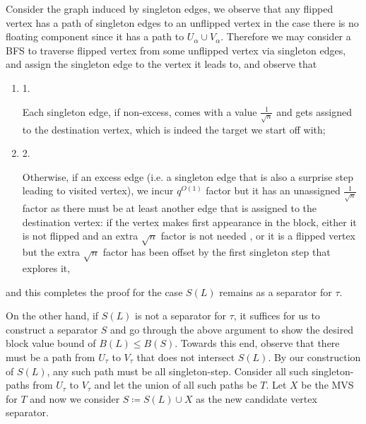 \documentclass[10pt,a4paper]{article}
\begin{document}
Consider the graph induced by singleton edges, we observe that any flipped vertex has a path of singleton edges to an unflipped vertex in the case there is no floating component since it has a path to $U_{\alpha}\cup V_{\alpha}$. Therefore we may consider a BFS to traverse flipped vertex from some unflipped vertex via singleton edges, and assign the singleton edge to the vertex it leads to, and observe that\par


\begin{enumerate}


\item[] 
1. 


Each singleton edge, if non-excess, comes with a value $\frac{1}{\sqrt{n}}$ and gets assigned to the destination vertex, which is indeed the target we start off with;\par





\item[] 
2. 


Otherwise, if an excess edge (i.e. a singleton edge that is also a surprise step leading to visited vertex), we incur $q^{O(1)}$ factor but it has an unassigned $\frac{1}{\sqrt{n}}$ factor as there must be at least another edge that is assigned to the destination vertex: if the vertex makes first appearance in the block, either it is not flipped and an extra $\sqrt{n}$ factor is not needed , or it is a flipped vertex but the extra $\sqrt{n}$ factor has been offset by the first singleton step that explores it\thinspace{},\par





\end{enumerate}


and this completes the proof for the case $S(L)$ remains as a separator for $\tau$.\par




On the other hand, if $S(L)$ is not a separator for $\tau$, it suffices for us to construct a separator $S$ and go through the above argument to show the desired block value bound of $B(L)\leq B(S)$. Towards this end, observe that there must be a path from $U_{\tau}$ to $V_{\tau}$ that does not intersect $S(L)$. By our construction of $S(L)$, any such path must be all singleton-step. Consider all such singleton-paths from $U_{\tau}$ to $V_{\tau}$ and let the union of all such paths be $T$. Let $X$ be the MVS for $T$ and now we consider $S\coloneqq S(L)\cup X$ as the new candidate vertex separator.\par
\end{document}

